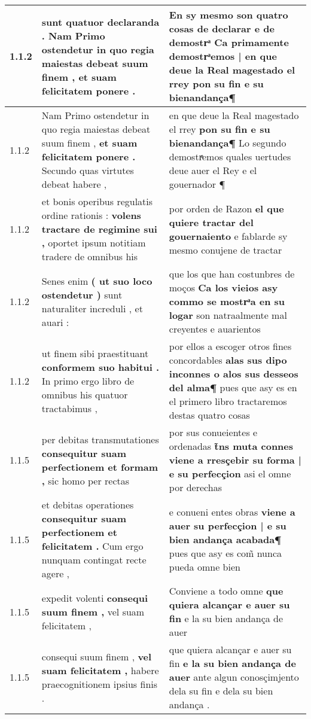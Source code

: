 \begin{tabular}{|p{1cm}|p{6.5cm}|p{6.5cm}|}
1.1.2 & sunt quatuor declaranda . \textbf{ Nam Primo ostendetur in quo regia maiestas debeat suum finem , } et suam felicitatem ponere . & En sy mesmo son quatro cosas de declarar e de demostrͣ \textbf{ Ca primamente demostrͣemos | en que deue la Real magestado el rrey } pon su fin e su bienandança¶ \\\hline
1.1.2 & Nam Primo ostendetur in quo regia maiestas debeat suum finem , \textbf{ et suam felicitatem ponere . } Secundo quas virtutes debeat habere , & en que deue la Real magestado el rrey \textbf{ pon su fin e su bienandança¶ } Lo segundo demostrͣemos quales uertudes deue auer el Rey e el gouernador ¶ \\\hline
1.1.2 & et bonis operibus regulatis ordine rationis : \textbf{ volens tractare de regimine sui , } oportet ipsum notitiam tradere de omnibus his & por orden de Razon \textbf{ el que quiere tractar del gouernaiento } e fablarde sy mesmo conujene de tractar \\\hline
1.1.2 & Senes enim \textbf{ ( ut suo loco ostendetur ) } sunt naturaliter increduli , et auari : & que los que han costunbres de moços \textbf{ Ca los vieios asy commo se mostrͣa en su logar } son natraalmente mal creyentes e auarientos \\\hline
1.1.2 & ut finem sibi praestituant \textbf{ conformem suo habitui . } In primo ergo libro de omnibus his quatuor tractabimus , & por ellos a escoger otros fines concordables \textbf{ alas sus dipo inconnes o alos sus desseos del alma¶ } pues que asy es en el primero libro tractaremos destas quatro cosas \\\hline
1.1.5 & per debitas transmutationes \textbf{ consequitur suam perfectionem et formam , } sic homo per rectas & por sus conueientes e ordenadas \textbf{ t̃ns muta connes viene a rresçebir su forma | e su perfecçion } asi el omne por derechas \\\hline
1.1.5 & et debitas operationes \textbf{ consequitur suam perfectionem et felicitatem . } Cum ergo nunquam contingat recte agere , & e conueni entes obras \textbf{ viene a auer su perfecçion | e su bien andança acabada¶ } pues que asy es com̃ nunca pueda omne bien \\\hline
1.1.5 & expedit volenti \textbf{ consequi suum finem , } vel suam felicitatem , & Conviene a todo omne \textbf{ que quiera alcançar e auer su fin } e la su bien andança de auer \\\hline
1.1.5 & consequi suum finem , \textbf{ vel suam felicitatem , } habere praecognitionem ipsius finis . & que quiera alcançar e auer su fin \textbf{ e la su bien andança de auer } ante algun conosçimjento dela su fin e dela su bien andança . \\\hline

\end{tabular}
